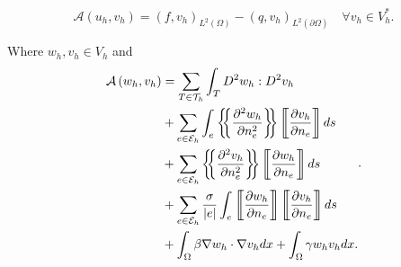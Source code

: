 \begin{equation}
\label{eq:C0-methoda}
\mathcal{A} \left( u_{h}, v_{h}  \right) = \left( f, v_{h} \right)_{L^{2}\left( \Omega  \right)} - \left( q, v_{h}
\right) _{L^{2}\left( \partial \Omega  \right)} \quad  \forall v_{h} \in V_{h}^{*}
.\end{equation}

Where $w_{h}, v_{h} \in  V_{h}$ and
\begin{equation}
\label{eq:C0-methodb}
\begin{split}
    \mathcal{A} \left( w_{h}, v_{h} \right) &=  \sum_{T \in \mathcal{T} _{h}}^{} \int_{T}^{} D^2 w_{h} : D^2 v_{h}  \\
    & + \sum_{e \in  \mathcal{E} _{h}}^{} \int_{e}^{ } \mean{ \frac{\partial ^2 w _{h}}{\partial n_{e}^2 } } \jump{
    \frac{\partial v_{h}}{\partial  n_{e}} }  ds \\
    & + \sum_{e \in \mathcal{E} _{h}}^{} \mean{ \frac{\partial ^2
v_{h}}{\partial n_{e }^2 } } \jump{ \frac{\partial w_{h}}{\partial n_{e}} }  ds \\
 &  + \sum_{e \in \mathcal{E} _{h}}^{} \frac{\sigma }{\left\lvert e \right\rvert } \int_{e}^{} \jump{ \frac{\partial
 w_{h}}{\partial n_{e}}} \jump{ \frac{\partial v_{h}}{\partial n_{e}} } ds \\
 & + \int_{\Omega }^{}  \beta \nabla w_{h} \cdot \nabla v_{h} dx + \int_{\Omega }^{} \gamma w_{h} v_{h} dx .
\end{split}
.\end{equation}

